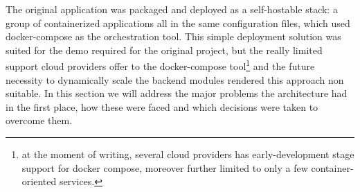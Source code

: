 The original application was packaged and deployed as a self-hostable stack: a group of containerized applications all in the same configuration files, which used docker-compose as the orchestration tool. This simple deployment solution was suited for the demo required for the original project, but the really limited support cloud providers offer to the docker-compose tool\footnote{at the moment of writing, several cloud providers has early-development stage support for docker compose, moreover further limited to only a few container-oriented services.} and the future necessity to dynamically scale the backend modules rendered this approach non suitable. In this section we will address the major problems the architecture had in the first place, how these were faced and which decisions were taken to overcome them.

